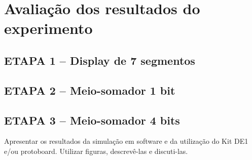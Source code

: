 \chapter{Avaliação dos resultados do experimento}
\section{ETAPA 1 – Display de 7 segmentos}
\section{ETAPA 2 – Meio-somador 1 bit}
\section{ETAPA 3 – Meio-somador 4 bits}


Apresentar os resultados da simulação em software e da utilização do Kit DE1 e/ou
protoboard. Utilizar figuras, descrevê-las e discuti-las.
